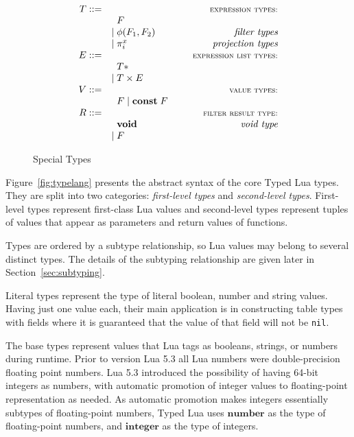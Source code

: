 \documentclass[10pt]{sigplanconf}
\newcommand{\Value}{\mathbf{value}}
\newcommand{\Integer}{\mathbf{integer}}
\newcommand{\Number}{\mathbf{number}}
\newcommand{\Const}{\mathbf{const}}
\begin{document}
\begin{figure}[t]
{\footnotesize
$$
\begin{array}{rlr}
T ::= & & \textsc{{\small expression types:}}\\
& \;\; F & \\
& | \; \phi(F_{1},F_{2}) & \textit{filter types}\\
& | \; \pi_{i}^{x} & \textit{projection types}\\
E ::= & & \textsc{{\small expression list types:}}\\
& \;\; T{*} & \\
& | \; T \times E & \\
V ::= & & \textsc{{\small value types:}}\\
& \;\; F \; | \; \Const \; F &\\
R ::= & & \textsc{\small{filter result type:}}\\
& \;\; \mathbf{void} & \textit{void type}\\
& |\; F
\end{array}
$$
}
\caption{Special Types}
\label{fig:special}
\end{figure}

Figure~\ref{fig:typelang} presents the abstract syntax of
the core Typed Lua types. They are split into two categories:
\emph{first-level types} and \emph{second-level types}.
First-level types represent first-class Lua values and
second-level types represent tuples of values that appear
as parameters and return values of functions.

Types are ordered by a subtype relationship, so Lua values may belong to several distinct types. The details of the subtyping
relationship are given later in Section~\ref{sec:subtyping}.

Literal types represent the type of literal boolean, number
and string values. Having just one value each, their main application is in constructing table types with fields where it is guaranteed that the value of that field will not be {\tt nil}.

The base types represent values that Lua tags as booleans,
strings, or numbers during runtime. Prior to version Lua 5.3 all Lua numbers were double-precision floating point numbers.
Lua 5.3 introduced the possibility of having 64-bit integers
as numbers, with automatic promotion of integer values to
floating-point representation as needed. As automatic
promotion makes integers essentially subtypes of floating-point numbers, Typed Lua uses $\Number$ as the type of floating-point numbers, and $\Integer$ as the type of integers.
\end{document}

